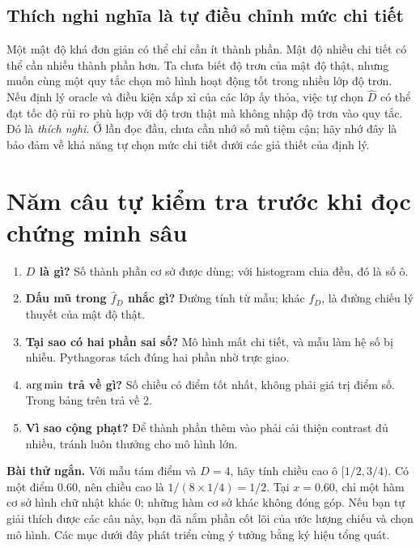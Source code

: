 \subsection{Thích nghi nghĩa là tự điều chỉnh mức chi tiết}
Một mật độ khá đơn giản có thể chỉ cần ít thành phần. Mật độ nhiều chi
 tiết có thể cần nhiều thành phần hơn. Ta chưa biết độ trơn của mật độ
thật, nhưng muốn cùng một quy tắc chọn mô hình hoạt động tốt trong
nhiều lớp độ trơn.
Nếu định lý oracle và điều kiện xấp xỉ của các lớp ấy thỏa, việc tự
chọn $\widehat D$ có thể đạt tốc độ rủi ro phù hợp với độ trơn thật mà
không nhập độ trơn vào quy tắc. Đó là \emph{thích nghi}.
Ở lần đọc đầu, chưa cần nhớ số mũ tiệm cận; hãy nhớ đây là bảo đảm
về khả năng tự chọn mức chi tiết dưới các giả thiết của định lý.

\section{Năm câu tự kiểm tra trước khi đọc chứng minh sâu}
\begin{enumerate}
\item \textbf{$D$ là gì?} Số thành phần cơ sở được dùng; với histogram
chia đều, đó là số ô.
\item \textbf{Dấu mũ trong $\widehat f_D$ nhắc gì?} Đường tính từ mẫu;
khác $f_D$, là đường chiếu lý thuyết của mật độ thật.
\item \textbf{Tại sao có hai phần sai số?} Mô hình mất chi tiết, và mẫu
làm hệ số bị nhiễu. Pythagoras tách đúng hai phần nhờ trực giao.
\item \textbf{$\operatorname*{arg\,min}$ trả về gì?} Số chiều có điểm tốt nhất, không
phải giá trị điểm số. Trong bảng trên trả về 2.
\item \textbf{Vì sao cộng phạt?} Để thành phần thêm vào phải cải thiện
contrast đủ nhiều, tránh luôn thưởng cho mô hình lớn.
\end{enumerate}
\textbf{Bài thử ngắn.} Với mẫu tám điểm và $D=4$, hãy tính chiều cao ô
$[1/2,3/4)$. Có một điểm $0.60$, nên chiều cao là
$1/(8\times1/4)=1/2$. Tại $x=0.60$, chỉ một hàm cơ sở hình chữ nhật
khác 0; những hàm cơ sở khác không đóng góp.
Nếu bạn tự giải thích được các câu này, bạn đã nắm phần cốt lõi của
ước lượng chiếu và chọn mô hình. Các mục dưới đây phát triển cùng ý
 tưởng bằng ký hiệu tổng quát.

